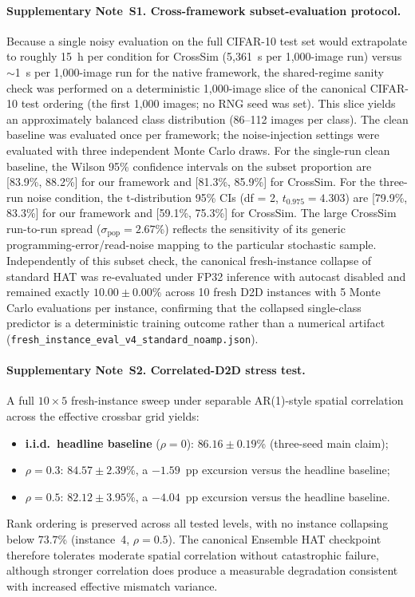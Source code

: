 \paragraph{Supplementary Note~S1. Cross-framework subset-evaluation protocol.}
Because a single noisy evaluation on the full CIFAR-10 test set would extrapolate to roughly 15~h per condition for CrossSim (5,361~s per 1,000-image run) versus $\sim$1~s per 1,000-image run for the native framework, the shared-regime sanity check was performed on a deterministic 1,000-image slice of the canonical CIFAR-10 test ordering (the first 1,000 images; no RNG seed was set). This slice yields an approximately balanced class distribution (86--112 images per class). The clean baseline was evaluated once per framework; the noise-injection settings were evaluated with three independent Monte Carlo draws. For the single-run clean baseline, the Wilson 95\% confidence intervals on the subset proportion are [83.9\%, 88.2\%] for our framework and [81.3\%, 85.9\%] for CrossSim. For the three-run noise condition, the t-distribution 95\% CIs (df = 2, $t_{0.975} = 4.303$) are [79.9\%, 83.3\%] for our framework and [59.1\%, 75.3\%] for CrossSim. The large CrossSim run-to-run spread ($\sigma_{\text{pop}} = 2.67$\%) reflects the sensitivity of its generic programming-error/read-noise mapping to the particular stochastic sample. Independently of this subset check, the canonical fresh-instance collapse of standard HAT was re-evaluated under FP32 inference with autocast disabled and remained exactly $10.00\pm0.00$\% across 10 fresh D2D instances with 5 Monte Carlo evaluations per instance, confirming that the collapsed single-class predictor is a deterministic training outcome rather than a numerical artifact (\texttt{fresh\_instance\_eval\_v4\_standard\_noamp.json}).

\paragraph{Supplementary Note~S2. Correlated-D2D stress test.}
A full $10\times5$ fresh-instance sweep under separable AR(1)-style spatial correlation across the effective crossbar grid yields:
\begin{itemize}
    \item \textbf{i.i.d.\ headline baseline} ($\rho=0$): $86.16 \pm 0.19$\% (three-seed main claim);
    \item \textbf{$\rho=0.3$}: $84.57 \pm 2.39$\%, a $-1.59$~pp excursion versus the headline baseline;
    \item \textbf{$\rho=0.5$}: $82.12 \pm 3.95$\%, a $-4.04$~pp excursion versus the headline baseline.
\end{itemize}
Rank ordering is preserved across all tested levels, with no instance collapsing below $73.7$\% (instance~4, $\rho=0.5$). The canonical Ensemble HAT checkpoint therefore tolerates moderate spatial correlation without catastrophic failure, although stronger correlation does produce a measurable degradation consistent with increased effective mismatch variance.

